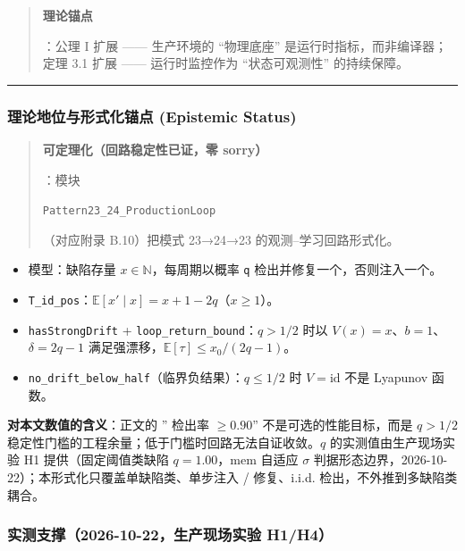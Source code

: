 \begin{quote}
\textbf{理论锚点}

：公理 I 扩展 ------ 生产环境的 ``物理底座''
是运行时指标，而非编译器；定理 3.1 扩展 ------ 运行时监控作为
``状态可观测性'' 的持续保障。
\end{quote}

\begin{center}\rule{0.5\linewidth}{0.5pt}\end{center}

\subsubsection{理论地位与形式化锚点 (Epistemic
Status)}\label{ux7406ux8bbaux5730ux4f4dux4e0eux5f62ux5f0fux5316ux951aux70b9-epistemic-status-1}

\begin{quote}
\textbf{可定理化（回路稳定性已证，零 sorry）}

：模块

\texttt{Pattern23\_24\_ProductionLoop}

（对应附录 B.10）把模式 23→24→23 的观测--学习回路形式化。
\end{quote}

\begin{itemize}
\item
  模型：缺陷存量 \(x\in\mathbb N\)，每周期以概率 \texttt{q}
  检出并修复一个，否则注入一个。
\item
  \texttt{T\_id\_pos}：\(\mathbb E[x'\mid x]=x+1-2q\)（\(x\ge1\)）。
\item
  \texttt{hasStrongDrift} + \texttt{loop\_return\_bound}：\(q>1/2\) 时以
  \(V(x)=x\)、\(b=1\)、\(\delta=2q-1\)
  满足强漂移，\(\mathbb E[\tau]\le x_0/(2q-1)\)。
\item
  \texttt{no\_drift\_below\_half}（临界负结果）：\(q\le1/2\) 时
  \(V=\mathrm{id}\) 不是 Lyapunov 函数。
\end{itemize}

\textbf{对本文数值的含义}：正文的 '' 检出率 \(\ge0.90\)''
不是可选的性能目标，而是 \(q>1/2\)
稳定性门槛的工程余量；低于门槛时回路无法自证收敛。\(q\)
的实测值由生产现场实验 H1 提供（固定阈值类缺陷 \(q=1.00\)，mem 自适应
\(\sigma\) 判据形态边界，2026-10-22）；本形式化只覆盖单缺陷类、单步注入
/ 修复、i.i.d. 检出，不外推到多缺陷类耦合。

\subsubsection{实测支撑（2026-10-22，生产现场实验
H1/H4）}\label{ux5b9eux6d4bux652fux64912026-10-22ux751fux4ea7ux73b0ux573aux5b9eux9a8c-h1h4}

